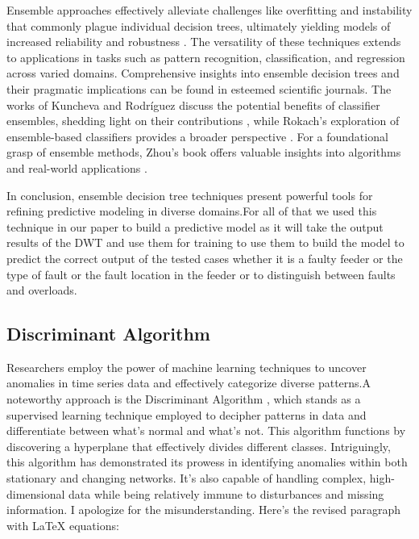 \documentclass[8pt,a4paper,oneside]{elsarticle}
\begin{document}
Ensemble approaches effectively alleviate challenges like overfitting and instability that commonly plague individual decision trees, ultimately yielding models of increased reliability and robustness \cite{rokach2010ensemble_32}. The versatility of these techniques extends to applications in tasks such as pattern recognition, classification, and regression across varied domains. Comprehensive insights into ensemble decision trees and their pragmatic implications can be found in esteemed scientific journals. The works of Kuncheva and Rodríguez discuss the potential benefits of classifier ensembles, shedding light on their contributions \cite{kuncheva2007classifier_31}, while Rokach's exploration of ensemble-based classifiers provides a broader perspective \cite{rokach2010ensemble_32}. For a foundational grasp of ensemble methods, Zhou's book offers valuable insights into algorithms and real-world applications \cite{zhou2012ensemble_33}.

In conclusion, ensemble decision tree techniques present powerful tools for refining predictive modeling in diverse domains.For all of that we used this technique in our paper to build a predictive model as it will take the output results of the DWT and use them for training to use them to build the model to predict the correct output of the tested cases whether it is a faulty feeder or the type of fault or the fault location in the feeder or to distinguish between faults and overloads.





\subsection{Discriminant Algorithm}
Researchers employ the power of machine learning techniques to uncover anomalies in time series data and effectively categorize diverse patterns.A noteworthy approach is the Discriminant Algorithm \cite{duda2000pattern_disc_duda_38}\cite{10.1016/c2009-0-27872-x_discrim_36}, which stands as a supervised learning technique employed to decipher patterns in data and differentiate between what's normal and what's not. This algorithm functions by discovering a hyperplane that effectively divides different classes. Intriguingly, this algorithm has demonstrated its prowess in identifying anomalies within both stationary and changing networks. It's also capable of handling complex, high-dimensional data while being relatively immune to disturbances and missing information.
I apologize for the misunderstanding. Here's the revised paragraph with LaTeX equations:
\end{document}
